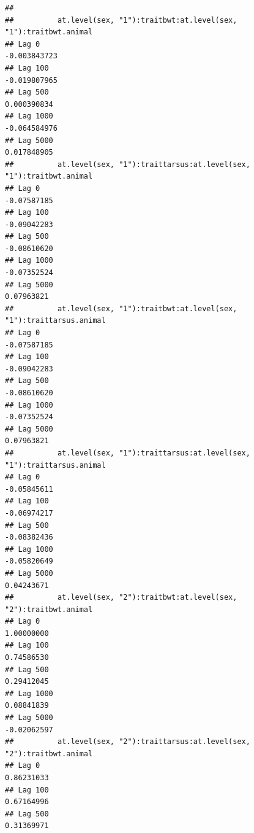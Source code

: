 \documentclass[
  12pt,
]{book}
\begin{document}
\begin{verbatim}
## 
##          at.level(sex, "1"):traitbwt:at.level(sex, "1"):traitbwt.animal
## Lag 0                                                      -0.003843723
## Lag 100                                                    -0.019807965
## Lag 500                                                     0.000390834
## Lag 1000                                                   -0.064584976
## Lag 5000                                                    0.017848905
##          at.level(sex, "1"):traittarsus:at.level(sex, "1"):traitbwt.animal
## Lag 0                                                          -0.07587185
## Lag 100                                                        -0.09042283
## Lag 500                                                        -0.08610620
## Lag 1000                                                       -0.07352524
## Lag 5000                                                        0.07963821
##          at.level(sex, "1"):traitbwt:at.level(sex, "1"):traittarsus.animal
## Lag 0                                                          -0.07587185
## Lag 100                                                        -0.09042283
## Lag 500                                                        -0.08610620
## Lag 1000                                                       -0.07352524
## Lag 5000                                                        0.07963821
##          at.level(sex, "1"):traittarsus:at.level(sex, "1"):traittarsus.animal
## Lag 0                                                             -0.05845611
## Lag 100                                                           -0.06974217
## Lag 500                                                           -0.08382436
## Lag 1000                                                          -0.05820649
## Lag 5000                                                           0.04243671
##          at.level(sex, "2"):traitbwt:at.level(sex, "2"):traitbwt.animal
## Lag 0                                                        1.00000000
## Lag 100                                                      0.74586530
## Lag 500                                                      0.29412045
## Lag 1000                                                     0.08841839
## Lag 5000                                                    -0.02062597
##          at.level(sex, "2"):traittarsus:at.level(sex, "2"):traitbwt.animal
## Lag 0                                                           0.86231033
## Lag 100                                                         0.67164996
## Lag 500                                                         0.31369971

\end{verbatim}
\end{document}
